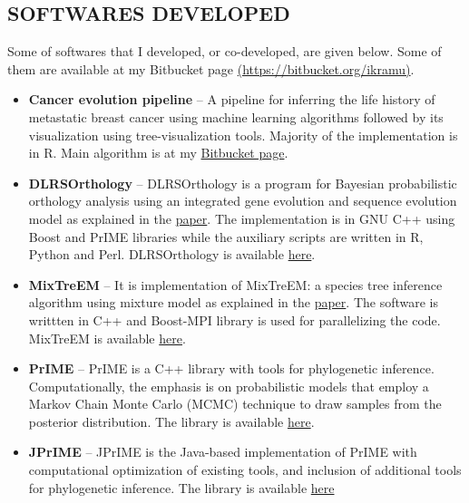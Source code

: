 \documentclass[margin, 10pt]{res} %
\begin{document}
\begin{resume}


\section{SOFTWARES DEVELOPED} 
Some of softwares that I developed, or co-developed, are given below. Some of them are available at my Bitbucket page \href{https://bitbucket.org/ikramu}{(https://bitbucket.org/ikramu)}.
\begin{itemize}
\item \textbf{Cancer evolution pipeline} -- A pipeline for inferring the life history of metastatic breast cancer using machine learning algorithms followed by its visualization using tree-visualization tools. Majority of the implementation is in R. Main algorithm is at my \href{https://bitbucket.org/ikramu/dolloparsimonyforcancerevolution}{Bitbucket page}. 
\item \textbf{DLRSOrthology} -- DLRSOrthology is a program for Bayesian probabilistic orthology analysis using an integrated gene evolution and sequence evolution model as explained in the \href{https://doi.org/10.1093/sysbio/syv044}{paper}. The implementation is in GNU C++ using Boost and PrIME libraries while the auxiliary scripts are written in R, Python and Perl. DLRSOrthology is available \href{https://bitbucket.org/ikramu/dlrsorthology}{here}.
\item \textbf{MixTreEM} -- It is implementation of MixTreEM: a species tree inference algorithm using mixture model as explained in the \href{https://doi.org/10.1093/molbev/msv115}{paper}. The software is writtten in C++ and Boost-MPI library is used for parallelizing the code. MixTreEM is available \href{https://bitbucket.org/ikramu/mixtreem}{here}.
\item \textbf{PrIME} -- PrIME is a C++ library with tools for phylogenetic inference. Computationally, the emphasis is on probabilistic models that employ a Markov Chain Monte Carlo (MCMC) technique to draw samples from the posterior distribution. The library is available \href{http://prime.scilifelab.se/}{here}.
\item \textbf{JPrIME} -- JPrIME is the Java-based implementation of PrIME with computational optimization of existing tools, and inclusion of additional tools for phylogenetic inference. The library is available \href{https://github.com/arvestad/jprime}{here}
\end{itemize}


\end{resume}
\end{document}
